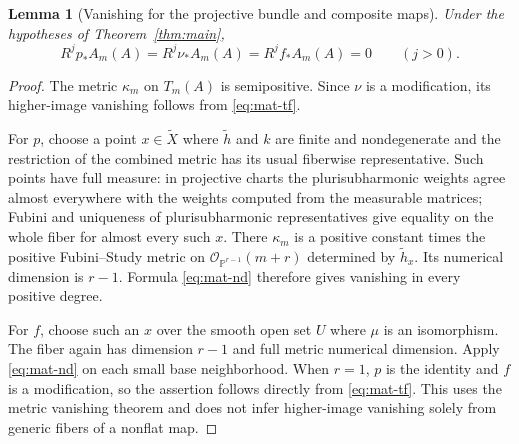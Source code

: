 \documentclass[11pt,reqno]{amsart}
\numberwithin{equation}{section}
\newtheorem{lemma}[theorem]{Lemma}
\theoremstyle{definition}
\theoremstyle{remark}
\newcommand{\OO}{\mathcal O}
\newcommand{\PP}{\mathbb P}
\begin{document}
\begin{lemma}[Vanishing for the projective bundle and composite maps]\label{lem:vanishing}
Under the hypotheses of Theorem~\ref{thm:main},
\begin{equation}\label{eq:threevanish}
 R^jp_*A_m(A)=R^j\nu_*A_m(A)=R^jf_*A_m(A)=0
 \qquad(j>0).
\end{equation}
\end{lemma}
\begin{proof}
The metric $\kappa_m$ on $T_m(A)$ is semipositive. Since $\nu$ is a modification, its higher-image vanishing follows from \eqref{eq:mat-tf}.

For $p$, choose a point $x\in\widetilde X$ where $\widetilde h$ and $k$ are finite and nondegenerate and the restriction of the combined metric has its usual fiberwise representative. Such points have full measure: in projective charts the plurisubharmonic weights agree almost everywhere with the weights computed from the measurable matrices; Fubini and uniqueness of plurisubharmonic representatives give equality on the whole fiber for almost every such $x$. There $\kappa_m$ is a positive constant times the positive Fubini--Study metric on $\OO_{\PP^{r-1}}(m+r)$ determined by $\widetilde h_x$. Its numerical dimension is $r-1$. Formula \eqref{eq:mat-nd} therefore gives vanishing in every positive degree.

For $f$, choose such an $x$ over the smooth open set $U$ where $\mu$ is an isomorphism. The fiber again has dimension $r-1$ and full metric numerical dimension. Apply \eqref{eq:mat-nd} on each small base neighborhood. When $r=1$, $p$ is the identity and $f$ is a modification, so the assertion follows directly from \eqref{eq:mat-tf}. This uses the metric vanishing theorem and does not infer higher-image vanishing solely from generic fibers of a nonflat map.
\end{proof}
\end{document}

